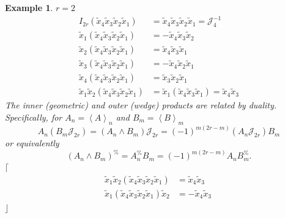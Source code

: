 \documentclass[aps,preprint]{revtex4}%
\newtheorem{example}[theorem]{Example}
\begin{document}
\begin{example}
$r=2$
\begin{align}
I_{2r}\left(  \widetilde{x}_{4}\widetilde{x}_{3}\widetilde{x}_{2}%
\widetilde{x}_{1}\right)   &  =\widetilde{x}_{4}\widetilde{x}_{3}%
\widetilde{x}_{2}\widetilde{x}_{1}=\mathcal{J}_{4}^{-1}\\
\widetilde{x}_{1}\left(  \widetilde{x}_{4}\widetilde{x}_{3}\widetilde{x}%
_{2}\widetilde{x}_{1}\right)   &  =-\widetilde{x}_{4}\widetilde{x}%
_{3}\widetilde{x}_{2}\\
\widetilde{x}_{2}\left(  \widetilde{x}_{4}\widetilde{x}_{3}\widetilde{x}%
_{2}\widetilde{x}_{1}\right)   &  =\widetilde{x}_{4}\widetilde{x}%
_{3}\widetilde{x}_{1}\\
\widetilde{x}_{3}\left(  \widetilde{x}_{4}\widetilde{x}_{3}\widetilde{x}%
_{2}\widetilde{x}_{1}\right)   &  =-\widetilde{x}_{4}\widetilde{x}%
_{2}\widetilde{x}_{1}\\
\widetilde{x}_{4}\left(  \widetilde{x}_{4}\widetilde{x}_{3}\widetilde{x}%
_{2}\widetilde{x}_{1}\right)   &  =\widetilde{x}_{3}\widetilde{x}%
_{2}\widetilde{x}_{1}\\
\widetilde{x}_{1}\widetilde{x}_{2}\left(  \widetilde{x}_{4}\widetilde{x}%
_{3}\widetilde{x}_{2}\widetilde{x}_{1}\right)   &  =\widetilde{x}_{1}\left(
\widetilde{x}_{4}\widetilde{x}_{3}\widetilde{x}_{1}\right)  =\widetilde{x}%
_{4}\widetilde{x}_{3}%
\end{align}
The inner (geometric) and outer (wedge) products are related by duality.
Specifically, for $A_{n}=\left\langle A\right\rangle _{n}$ and $B_{m}%
=\left\langle B\right\rangle _{m}$%
\begin{equation}
A_{n}(B_{m}\mathcal{J}_{2r})=(A_{n}\wedge B_{m})\mathcal{J}_{2r}=\left(
-1\right)  ^{m\left(  2r-m\right)  }(A_{n}\mathcal{J}_{2r})B_{m}%
\end{equation}
or equivalently%
\begin{equation}
(A_{n}\wedge B_{m})^{\%}=A_{n}^{\%}B_{m}=\left(  -1\right)  ^{m\left(
2r-m\right)  }A_{n}B_{m}^{\%}.
\end{equation}
$\lceil$%
\begin{align}
\widetilde{x}_{1}\widetilde{x}_{2}\left(  \widetilde{x}_{4}\widetilde{x}%
_{3}\widetilde{x}_{2}\widetilde{x}_{1}\right)   &  =\widetilde{x}%
_{4}\widetilde{x}_{3}\\
\widetilde{x}_{1}\left(  \widetilde{x}_{4}\widetilde{x}_{3}\widetilde{x}%
_{2}\widetilde{x}_{1}\right)  \widetilde{x}_{2}  &  =-\widetilde{x}%
_{4}\widetilde{x}_{3}\
\end{align}
$\rfloor$
\end{example}
\end{document}
